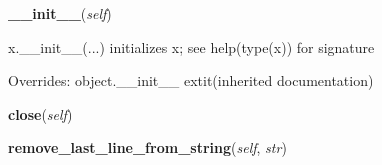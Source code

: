     \vspace{0.5ex}

\hspace{.8\funcindent}\begin{boxedminipage}{\funcwidth}

    \raggedright \textbf{\_\_init\_\_}(\textit{self})

\setlength{\parskip}{2ex}
    x.\_\_init\_\_(...) initializes x; see help(type(x)) for signature

\setlength{\parskip}{1ex}
      Overrides: object.\_\_init\_\_ 	extit{(inherited documentation)}

    \end{boxedminipage}

    \label{hpl_tap_dfx_api:HplTapDfxApi:close}

    \vspace{0.5ex}

\hspace{.8\funcindent}\begin{boxedminipage}{\funcwidth}

    \raggedright \textbf{close}(\textit{self})

\setlength{\parskip}{2ex}
\setlength{\parskip}{1ex}
    \end{boxedminipage}

    \label{hpl_tap_dfx_api:HplTapDfxApi:remove_last_line_from_string}

    \vspace{0.5ex}

\hspace{.8\funcindent}\begin{boxedminipage}{\funcwidth}

    \raggedright \textbf{remove\_last\_line\_from\_string}(\textit{self}, \textit{str})

\setlength{\parskip}{2ex}
\setlength{\parskip}{1ex}
    \end{boxedminipage}

    \label{hpl_tap_dfx_api:HplTapDfxApi:send_receive_message}

